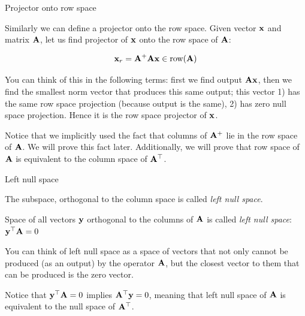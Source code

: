 \documentclass{beamer}
\begin{document}
\begin{frame}{Projector onto row space}
	\begin{flushleft}
		
		Similarly we can define a projector onto the row space. Given vector $\mathbf{x}$ and matrix $\mathbf{A}$, let us find projector of $\mathbf{x}$ onto the row space of $\mathbf{A}$:
		
		\begin{equation}
			\mathbf{x}_r = \mathbf{A}^+\mathbf{A} \mathbf{x} \in \text{row}(\mathbf{A})
		\end{equation}
		
		You can think of this in the following terms: first we find output $\mathbf{A} \mathbf{x}$, then we find the smallest norm vector that produces this same output; this vector  1) has the same row space projection (because output is the same), 2) has zero null space projection. Hence it is the row space projector of $\mathbf{x}$.
		
		\bigskip
		
		Notice that we implicitly used the fact that columns of $\mathbf{A}^+$ lie in the row space of $\mathbf{A}$. We will prove this fact later. Additionally, we will prove that row space of $\mathbf{A}$ is equivalent to the column space of $\mathbf{A}^\top$.
		
	\end{flushleft}
\end{frame}




\begin{frame}{Left null space}
	\begin{flushleft}
		
		The subspace, orthogonal to the column space is called \emph{left null space}.
		
		\bigskip
		
		\begin{definition}
			Space of all vectors $\mathbf{y}$ orthogonal to the columns of $\mathbf{A}$ is called \emph{left null space}: $\mathbf{y}^\top\mathbf{A} = 0$
		\end{definition}
		
		You can think of left null space as a space of vectors that not only cannot be produced (as an output) by the operator $\mathbf{A}$, but the closest vector to them that can be produced is the zero vector.
		
		\bigskip
		
		Notice that $\mathbf{y}^\top \mathbf{A} = 0$ implies $\mathbf{A}^\top \mathbf{y} = 0$, meaning that left null space of $\mathbf{A}$ is equivalent to the null space of $\mathbf{A}^\top$.
		
		
	\end{flushleft}
\end{frame}
\end{document}
